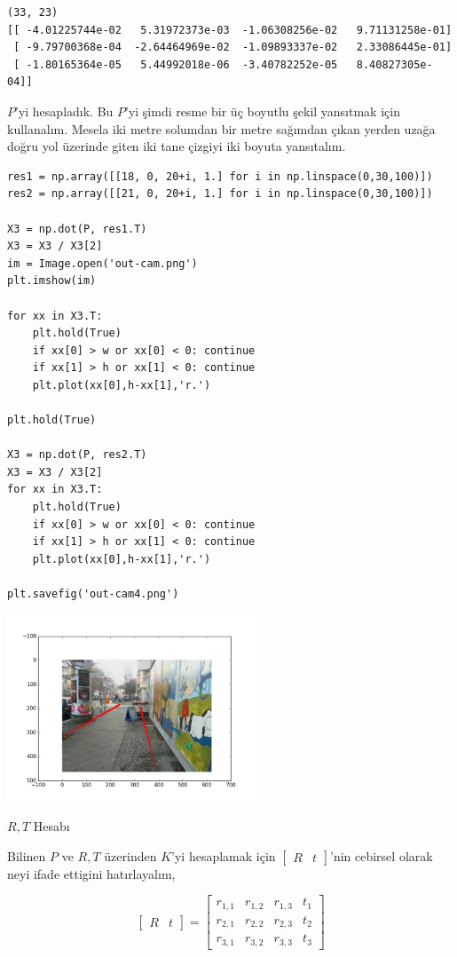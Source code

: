 \documentclass[12pt,fleqn]{article}\usepackage{../../common}
\begin{document}
\begin{verbatim}
(33, 23)
[[ -4.01225744e-02   5.31972373e-03  -1.06308256e-02   9.71131258e-01]
 [ -9.79700368e-04  -2.64464969e-02  -1.09893337e-02   2.33086445e-01]
 [ -1.80165364e-05   5.44992018e-06  -3.40782252e-05   8.40827305e-04]]
\end{verbatim}

$P$'yi hesapladık. Bu $P$'yi şimdi resme bir üç boyutlu şekil yansıtmak
için kullanalım. Mesela iki metre solumdan bir metre sağımdan çıkan yerden
uzağa doğru yol üzerinde giten iki tane çizgiyi iki boyuta yansıtalım.

\begin{verbatim}
res1 = np.array([[18, 0, 20+i, 1.] for i in np.linspace(0,30,100)])
res2 = np.array([[21, 0, 20+i, 1.] for i in np.linspace(0,30,100)])

X3 = np.dot(P, res1.T)
X3 = X3 / X3[2]
im = Image.open('out-cam.png')
plt.imshow(im)

for xx in X3.T: 
    plt.hold(True)
    if xx[0] > w or xx[0] < 0: continue
    if xx[1] > h or xx[1] < 0: continue
    plt.plot(xx[0],h-xx[1],'r.')

plt.hold(True)

X3 = np.dot(P, res2.T)
X3 = X3 / X3[2]
for xx in X3.T: 
    plt.hold(True)
    if xx[0] > w or xx[0] < 0: continue
    if xx[1] > h or xx[1] < 0: continue
    plt.plot(xx[0],h-xx[1],'r.')

plt.savefig('out-cam4.png')
\end{verbatim}

\includegraphics[width=20em]{out-cam4.png}

$R,T$ Hesabı

Bilinen $P$ ve $R,T$ üzerinden $K$'yi hesaplamak için
$\left[\begin{array}{c|c}R&t\end{array}\right]$'nin cebirsel olarak neyi
ifade ettigini hatırlayalım,

$$ 
\left[\begin{array}{c|c}
R & t
\end{array}\right] = 
\left[\begin{array}{ccc|c}
r_{1,1} & r_{1,2} & r_{1,3} & t_1 \\
r_{2,1} & r_{2,2} & r_{2,3} & t_2 \\
r_{3,1} & r_{3,2} & r_{3,3} & t_3 
\end{array}\right]
$$
\end{document}
